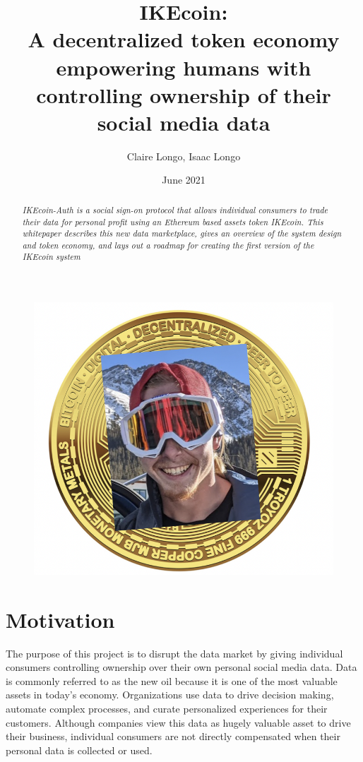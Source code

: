 \documentclass[12pt, letterpaper, twoside]{article}
\title{\color{cyan}IKEcoin: \\ 
\large A decentralized token economy empowering humans with controlling ownership of their social media data}
\author{Claire Longo, Isaac Longo}
\date{June 2021}
\begin{document}
\maketitle

\begin{figure}[h]
  \includegraphics[scale=0.3]{media/IKEcoin.jpg}
  \centering
\end{figure}

\begin{abstract}
\textit{IKEcoin-Auth is a social sign-on protocol that allows individual consumers to trade their data for personal profit using an Ethereum based assets token IKEcoin. This whitepaper describes this new data marketplace, gives an overview of the system design and token economy, and lays out a roadmap for creating the first version of the IKEcoin system }
\end{abstract}
 \pagebreak

\section{Motivation}
The purpose of this project is to disrupt the data market by giving individual consumers controlling ownership over their own personal social media data. Data is commonly referred to as the new oil because it is one of the most valuable assets in today's economy. Organizations use data to drive decision making, automate complex processes, and curate personalized experiences for their customers. Although companies view this data as hugely valuable asset to drive their business, individual consumers are not directly compensated when their personal data is collected or used. \\
\end{document}
